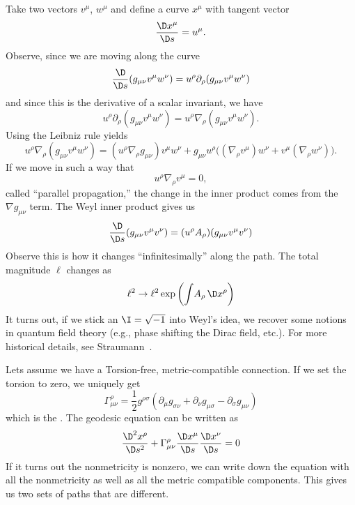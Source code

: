 Take two vectors $v^{\mu}$, $w^{\mu}$ and define a curve
$x^{\mu}$ with tangent vector
\begin{equation}
\frac{\D x^{\mu}}{\D s}=u^{\mu}.
\end{equation}
Observe, since we are moving along the curve
\begin{equation}
\frac{\D}{\D s}(g_{\mu\nu}v^{\mu}w^{\nu})=u^{\rho}\partial_{\rho}(g_{\mu\nu}v^{\mu}w^{\nu})
\end{equation}
and since this is the derivative of a scalar invariant, we have
\begin{equation}
u^{\rho}\partial_{\rho}(g_{\mu\nu}v^{\mu}w^{\nu})=
u^{\rho}\nabla_{\rho}(g_{\mu\nu}v^{\mu}w^{\nu}).
\end{equation}
Using the Leibniz rule yields
\begin{equation}
u^{\rho}\nabla_{\rho}(g_{\mu\nu}v^{\mu}w^{\nu})
=(u^{\rho}\nabla_{\rho}g_{\mu\nu})v^{\mu}w^{\nu}
+g_{\mu\nu}u^{\rho}\bigl(
(\nabla_{\rho}v^{\mu})w^{\nu}+
v^{\mu}(\nabla_{\rho}w^{\nu})
\bigr).
\end{equation}
If we move in such a way that
\begin{equation}
u^{\rho}\nabla_{\rho}v^{\mu}=0,
\end{equation}
called ``parallel propagation,'' the change in the inner product
comes from the $\nabla g_{\mu\nu}$ term. The Weyl inner product
gives us
\begin{equation}
\frac{\D}{\D s}(g_{\mu\nu}v^{\mu}v^{\nu})=(u^{\rho}A_{\rho})(g_{\mu\nu}v^{\mu}v^{\nu})
\end{equation}
Observe this is how it changes ``infinitesimally'' along the
path. The total magnitude $\ell$ changes as
\begin{equation}
\ell^{2}\to\ell^{2}\exp\left(\int\! A_{\rho}\,\D x^{\rho}\right)
\end{equation}
It turns out, if we stick an $\I=\sqrt{-1}$ into Weyl's idea, we
recover some notions in quantum field theory (e.g., phase
shifting the Dirac field, etc.). For more historical details, see Straumann~\cite{Straumann:2005hj}.

Lets assume we have a Torsion-free, metric-compatible
connection. If we set the torsion to zero, we uniquely get
\begin{equation}
\Gamma^{\rho}_{\mu\nu}=\frac{1}{2}g^{\rho\sigma}
(\partial_{\mu}g_{\sigma\nu}+\partial_{\nu}g_{\mu\sigma}
-\partial_{\sigma}g_{\mu\nu})
\end{equation}
which is the . The geodesic
equation can be written as
\begin{equation}
\frac{\D^{2}x^{\rho}}{\D s^{2}}
+\Gamma^{\rho}_{\mu\nu}\frac{\D x^{\mu}}{\D s}\frac{\D x^{\nu}}{\D s}
=0
\end{equation}
If it turns out the nonmetricity is nonzero, we can write down
the equation with all the nonmetricity as well as all the metric
compatible components. This gives us two sets of paths that are different.

